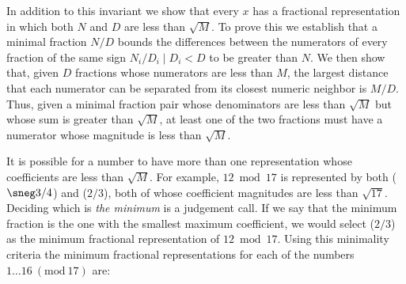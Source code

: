 \documentclass[submission,copyright,creativecommons]{eptcs}
\newcommand{\Mod}[1]{\ (\mathrm{mod}\ #1)}
\begin{document}


In addition to this invariant we show that every $x$ has a fractional
representation in which both $N$ and $D$ are less than $\sqrt{M}$.
To prove this we establish that a minimal fraction $N/D$ bounds the
differences between the numerators of every fraction of the same sign
$N_i/D_i \mid D_i < D$ to be greater than $N$.  We then show that,
given $D$ fractions whose numerators are less than $M$, the largest
distance that each numerator can be separated from its closest numeric
neighbor is $M/D$.  Thus, given a minimal fraction pair whose
denominators are less than $\sqrt{M}$ but whose sum is greater than
$\sqrt{M}$, at least one of the two fractions must have a numerator
whose magnitude is less than $\sqrt{M}$.


It is possible for a number to have more than one representation whose
coefficients are less than $\sqrt{M}$.  For example, $12 \bmod 17$ is
represented by both ($\sneg3/4$) and ($2/3$), both of whose
coefficient magnitudes are less than $\sqrt{17}$.  Deciding which is
\emph{the minimum} is a judgement call.  If we say that the
minimum fraction is the one with the smallest maximum coefficient, we
would select ($2/3$) as the minimum fractional representation of $12 \bmod 17$.  
Using this minimality criteria the minimum fractional
representations for each of the numbers $1\dots16 \Mod{17}$ are:
\end{document}
